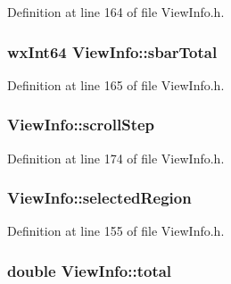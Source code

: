 Definition at line 164 of file View\+Info.\+h.

\subsubsection[{\texorpdfstring{sbar\+Total}{sbarTotal}}]{\setlength{\rightskip}{0pt plus 5cm}wx\+Int64 View\+Info\+::sbar\+Total}\hypertarget{class_view_info_a4d4f7bcd9cca14e25a2d9fb90f768b53}{}\label{class_view_info_a4d4f7bcd9cca14e25a2d9fb90f768b53}


Definition at line 165 of file View\+Info.\+h.

\subsubsection[{\texorpdfstring{scroll\+Step}{scrollStep}}]{ View\+Info\+::scroll\+Step}\hypertarget{class_view_info_aee3714d955a107a54458e99fa7234a93}{}\label{class_view_info_aee3714d955a107a54458e99fa7234a93}


Definition at line 174 of file View\+Info.\+h.

\subsubsection[{\texorpdfstring{selected\+Region}{selectedRegion}}]{ View\+Info\+::selected\+Region}\hypertarget{class_view_info_a07895f02c517d048cc1ca855b0efa54e}{}\label{class_view_info_a07895f02c517d048cc1ca855b0efa54e}


Definition at line 155 of file View\+Info.\+h.

\subsubsection[{\texorpdfstring{total}{total}}]{\setlength{\rightskip}{0pt plus 5cm}double View\+Info\+::total}\hypertarget{class_view_info_a7183cfda6c309fdba18c625cce4378b7}{}\label{class_view_info_a7183cfda6c309fdba18c625cce4378b7}


